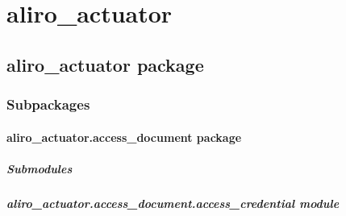 \documentclass[letterpaper,10pt,english]{sphinxmanual}
\begin{document}
\section{aliro\_actuator}
\label{\detokenize{modules:aliro-actuator}}\label{\detokenize{modules::doc}}
\sphinxstepscope


\subsection{aliro\_actuator package}
\label{\detokenize{aliro_actuator:aliro-actuator-package}}\label{\detokenize{aliro_actuator::doc}}

\subsubsection{Subpackages}
\label{\detokenize{aliro_actuator:subpackages}}
\sphinxstepscope


\paragraph{aliro\_actuator.access\_document package}
\label{\detokenize{aliro_actuator.access_document:aliro-actuator-access-document-package}}\label{\detokenize{aliro_actuator.access_document::doc}}

\subparagraph{Submodules}
\label{\detokenize{aliro_actuator.access_document:submodules}}
\sphinxstepscope


\subparagraph{aliro\_actuator.access\_document.access\_credential module}
\label{\detokenize{aliro_actuator.access_document.access_credential:module-aliro_actuator.access_document.access_credential}}\label{\detokenize{aliro_actuator.access_document.access_credential:aliro-actuator-access-document-access-credential-module}}\label{\detokenize{aliro_actuator.access_document.access_credential::doc}}
\end{document}
